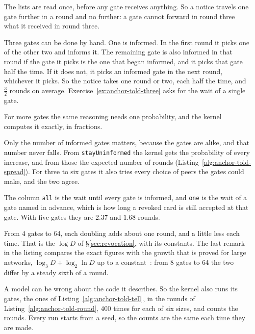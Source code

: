 The lists are read once, before any gate receives anything. So a notice
travels one gate further in a round and no further: a gate cannot forward
in round three what it received in round three.

Three gates can be done by hand. One is informed. In the first round it
picks one of the other two and informs it. The remaining gate is also
informed in that round if the gate it picks is the one that began
informed, and it picks that gate half the time. If it does not, it picks
an informed gate in the next round, whichever it picks. So the notice takes
one round or two, each half the time, and $\tfrac32$ rounds on average.
Exercise~\ref{ex:anchor-told-three} asks for the wait of a single gate.

For more gates the same reasoning needs one probability, and the kernel
computes it exactly, in fractions.


Only the number of informed gates matters, because the gates are
alike, and that number never falls. From \texttt{stayUninformed} the kernel
gets the probability of every increase, and from those the expected number
of rounds (Listing~\ref{alg:anchor-told-spread}). For three to six gates it
also tries every choice of peers the gates could make, and the two agree.

The column \texttt{all} is the wait until every gate is informed, and
\texttt{one} is the wait of a gate named in advance, which is how long a
revoked card is still accepted at that gate. With five gates they are $2.37$
and $1.68$ rounds.


From 4 gates to 64, each doubling adds about one round,
and a little less each time. That is the $\log D$ of
\S\ref{sec:revocation}, with its constants. The last remark in the
listing compares the exact figures with the growth that is proved for large
networks, $\log_3 D + \log_2 \ln D$ up to a constant~:
from 8 gates to 64 the two differ by a steady sixth of a round.

A model can be wrong about the code it describes. So the kernel also runs
its gates, the ones of Listing~\ref{alg:anchor-told-tell}, in the rounds
of Listing~\ref{alg:anchor-told-round}, 400 times for each of six sizes,
and counts the rounds. Every run starts from a seed, so the counts are the
same each time they are made.

